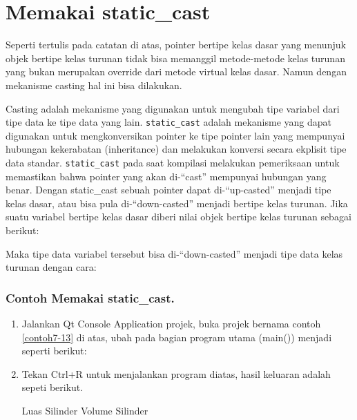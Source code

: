 \section{Memakai static\_cast}\label{memakai-staticux5fcast}

Seperti tertulis pada catatan di atas, pointer bertipe kelas dasar yang
menunjuk objek bertipe kelas turunan tidak bisa memanggil metode-metode
kelas turunan yang bukan merupakan override dari metode virtual kelas
dasar. Namun dengan mekanisme casting hal ini bisa dilakukan.

Casting adalah mekanisme yang digunakan untuk mengubah tipe variabel
dari tipe data ke tipe data yang lain. \texttt{static\_cast} adalah
mekanisme yang dapat digunakan untuk mengkonversikan pointer ke tipe
pointer lain yang mempunyai hubungan kekerabatan (inheritance) dan
melakukan konversi secara ekplisit tipe data standar.
\texttt{static\_cast} pada saat kompilasi melakukan pemeriksaan untuk
memastikan bahwa pointer yang akan di-``cast'' mempunyai hubungan yang
benar. Dengan static\_cast sebuah pointer dapat di-``up-casted'' menjadi
tipe kelas dasar, atau bisa pula di-``down-casted'' menjadi bertipe
kelas turunan. Jika suatu variabel bertipe kelas dasar diberi nilai
objek bertipe kelas turunan sebagai berikut:



Maka tipe data variabel tersebut bisa di-``down-casted'' menjadi tipe
data kelas turunan dengan cara:



\subsubsection*{Contoh Memakai static\_cast.}

\begin{enumerate}
\item Jalankan Qt Console Application projek, buka projek bernama contoh \ref{contoh7-13} di
atas, ubah pada bagian program utama (main()) menjadi seperti berikut:



\item Tekan Ctrl+R untuk menjalankan program diatas, hasil keluaran adalah
sepeti berikut.

\begin{lcverbatim}
Luas Silinder
Volume Silinder
\end{lcverbatim}

\end{enumerate}

